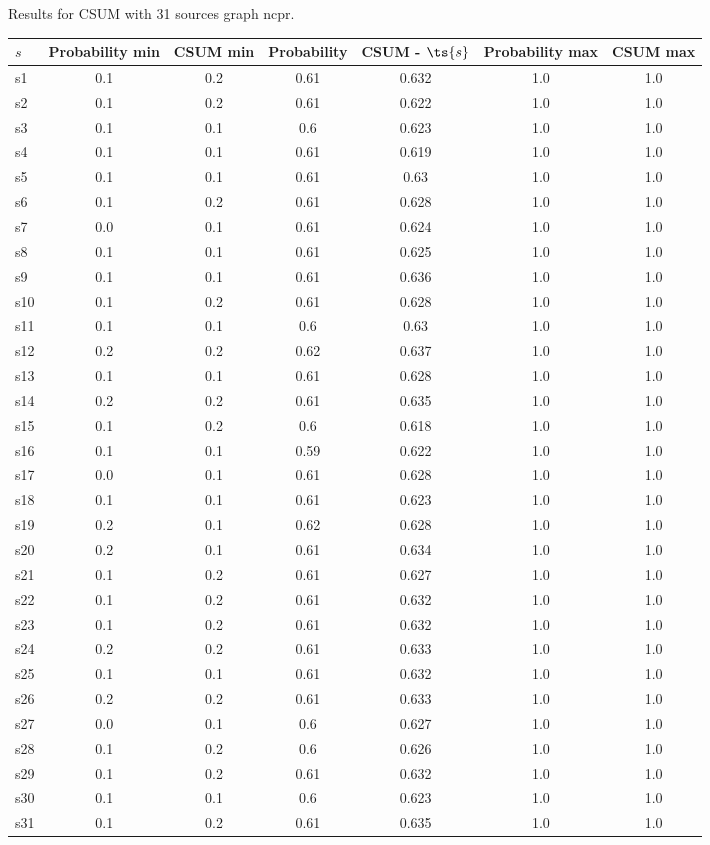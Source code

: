 \documentclass{article}
\begin{document}
\noindent Results for CSUM with 31 sources graph ncpr.

\noindent\begin{tabular}{|l|c|c|c|c|c|c|}
\hline
$s$& Probability min & CSUM min & Probability & CSUM - $\ts{s}$ & Probability max & CSUM max\\
\hline
s1 &0.1 & 0.2 & 0.61 & 0.632 & 1.0 & 1.0\\
\hline
s2 &0.1 & 0.2 & 0.61 & 0.622 & 1.0 & 1.0\\
\hline
s3 &0.1 & 0.1 & 0.6 & 0.623 & 1.0 & 1.0\\
\hline
s4 &0.1 & 0.1 & 0.61 & 0.619 & 1.0 & 1.0\\
\hline
s5 &0.1 & 0.1 & 0.61 & 0.63 & 1.0 & 1.0\\
\hline
s6 &0.1 & 0.2 & 0.61 & 0.628 & 1.0 & 1.0\\
\hline
s7 &0.0 & 0.1 & 0.61 & 0.624 & 1.0 & 1.0\\
\hline
s8 &0.1 & 0.1 & 0.61 & 0.625 & 1.0 & 1.0\\
\hline
s9 &0.1 & 0.1 & 0.61 & 0.636 & 1.0 & 1.0\\
\hline
s10 &0.1 & 0.2 & 0.61 & 0.628 & 1.0 & 1.0\\
\hline
s11 &0.1 & 0.1 & 0.6 & 0.63 & 1.0 & 1.0\\
\hline
s12 &0.2 & 0.2 & 0.62 & 0.637 & 1.0 & 1.0\\
\hline
s13 &0.1 & 0.1 & 0.61 & 0.628 & 1.0 & 1.0\\
\hline
s14 &0.2 & 0.2 & 0.61 & 0.635 & 1.0 & 1.0\\
\hline
s15 &0.1 & 0.2 & 0.6 & 0.618 & 1.0 & 1.0\\
\hline
s16 &0.1 & 0.1 & 0.59 & 0.622 & 1.0 & 1.0\\
\hline
s17 &0.0 & 0.1 & 0.61 & 0.628 & 1.0 & 1.0\\
\hline
s18 &0.1 & 0.1 & 0.61 & 0.623 & 1.0 & 1.0\\
\hline
s19 &0.2 & 0.1 & 0.62 & 0.628 & 1.0 & 1.0\\
\hline
s20 &0.2 & 0.1 & 0.61 & 0.634 & 1.0 & 1.0\\
\hline
s21 &0.1 & 0.2 & 0.61 & 0.627 & 1.0 & 1.0\\
\hline
s22 &0.1 & 0.2 & 0.61 & 0.632 & 1.0 & 1.0\\
\hline
s23 &0.1 & 0.2 & 0.61 & 0.632 & 1.0 & 1.0\\
\hline
s24 &0.2 & 0.2 & 0.61 & 0.633 & 1.0 & 1.0\\
\hline
s25 &0.1 & 0.1 & 0.61 & 0.632 & 1.0 & 1.0\\
\hline
s26 &0.2 & 0.2 & 0.61 & 0.633 & 1.0 & 1.0\\
\hline
s27 &0.0 & 0.1 & 0.6 & 0.627 & 1.0 & 1.0\\
\hline
s28 &0.1 & 0.2 & 0.6 & 0.626 & 1.0 & 1.0\\
\hline
s29 &0.1 & 0.2 & 0.61 & 0.632 & 1.0 & 1.0\\
\hline
s30 &0.1 & 0.1 & 0.6 & 0.623 & 1.0 & 1.0\\
\hline
s31 &0.1 & 0.2 & 0.61 & 0.635 & 1.0 & 1.0\\
\hline
\end{tabular}\\
\end{document}
